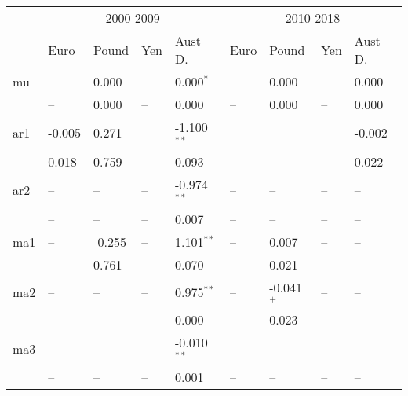 \documentclass[12pt]{article}
\begin{document}
\begin{table}
	\fontsize{10pt}{10pt}\selectfont
	\begin{tabular}{l l l l l | l l l l}
				   & \multicolumn{4}{c}{2000-2009} & \multicolumn{4}{c}{2010-2018} \\
				   & Euro & Pound & Yen & Aust D. & Euro & Pound & Yen & Aust D. \\
			\midrule
        	mu     &     --        &  0.000        &     --        &  0.000$^{*}$  &     --        &  0.000        &    --        &  0.000        \\
        	       &     --        &  0.000        &     --        &  0.000        &     --        &  0.000        &    --        &  0.000        \\
            ar1    & -0.005        &  0.271        &     --        & -1.100$^{**}$ &     --        &     --        &    --        & -0.002        \\
                   &  0.018        &  0.759        &     --        &  0.093        &     --        &     --        &    --        &  0.022        \\
        	ar2    &     --        &     --        &     --        & -0.974$^{**}$ &     --        &     --        &    --        &     --        \\
        		   &     --        &     --        &     --        &  0.007        &     --        &     --        &    --        &     --        \\
        	ma1    &     --        & -0.255        &     --        &  1.101$^{**}$ &     --        &  0.007        &    --        &     --        \\
        		   &     --        &  0.761        &     --        &  0.070        &     --        &  0.021        &    --        &     --        \\
        	ma2    &     --        &     --        &     --        &  0.975$^{**}$ &     --        & -0.041$^{+}$  &    --        &     --        \\
        		   &     --        &     --        &     --        &  0.000        &     --        &  0.023        &    --        &     --        \\
        	ma3    &     --        &     --        &     --        & -0.010$^{**}$ &     --        &     --        &    --        &     --        \\
        		   &     --        &     --        &     --        &  0.001        &     --        &     --        &    --        &     --        \\

\end{tabular}
\end{table}
\end{document}
